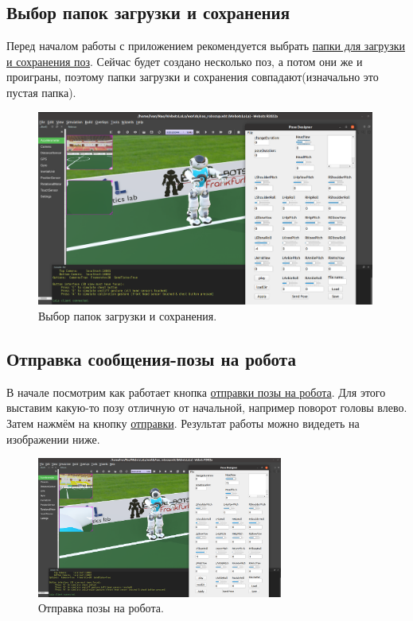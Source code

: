 \documentclass[12pt,a4paper]{article}
\begin{document}
\subsection{Выбор папок загрузки и сохранения}
Перед началом работы с приложением рекомендуется выбрать \hyperref[file]{папки для загрузки и сохранения поз}. Сейчас будет создано несколько поз, а потом они же и проиграны, поэтому папки загрузки и сохранения совпадают(изначально это пустая папка).
\begin{figure}[h!]
    \centering
    \includegraphics[width = 0.99\textwidth]{./images/webotsDirSelect.png}
    \caption{Выбор папок загрузки и сохранения.}
    \label{fig:webotsDirSelect}
\end{figure}
\newpage
\subsection{Отправка сообщения-позы на робота}
В начале посмотрим как работает кнопка \hyperref[sendPose]{отправки позы на робота}. Для этого выставим какую-то позу отличную от начальной, например поворот головы влево. Затем нажмём на кнопку \hyperref[sendPose]{отправки}. Результат работы можно видедеть на изображении ниже.
\begin{figure}[h!]
    \centering
    \includegraphics[width = 0.72\textwidth]{./images/firstTurn.png}
    \caption{Отправка позы на робота.}
    \label{fig:my_label}
\end{figure}
\end{document}
